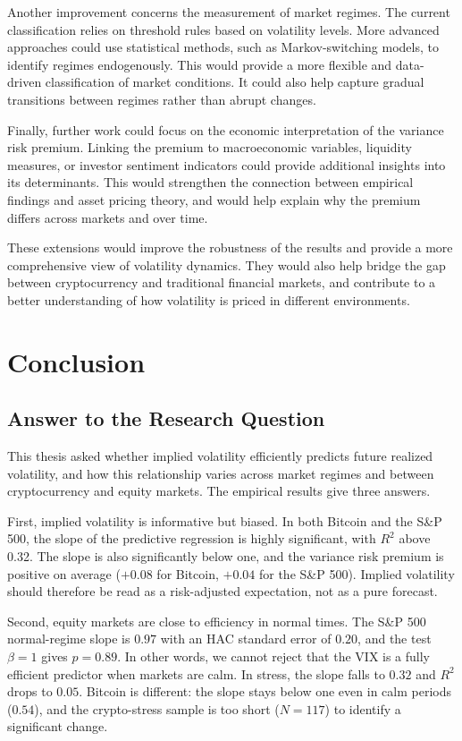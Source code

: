 \documentclass[11pt,a4paper,openany]{report}
\begin{document}
Another improvement concerns the measurement of market regimes. The
current classification relies on threshold rules based on volatility
levels. More advanced approaches could use statistical methods, such as
Markov-switching models, to identify regimes endogenously. This would
provide a more flexible and data-driven classification of market
conditions. It could also help capture gradual transitions between
regimes rather than abrupt changes.

Finally, further work could focus on the economic interpretation of the
variance risk premium. Linking the premium to macroeconomic variables,
liquidity measures, or investor sentiment indicators could provide
additional insights into its determinants. This would strengthen the
connection between empirical findings and asset pricing theory, and
would help explain why the premium differs across markets and over time.

These extensions would improve the robustness of the results and provide
a more comprehensive view of volatility dynamics. They would also help
bridge the gap between cryptocurrency and traditional financial markets,
and contribute to a better understanding of how volatility is priced in
different environments.

\chapter{Conclusion}\label{conclusion}

\section{Answer to the Research
Question}\label{answer-to-the-research-question}

This thesis asked whether implied volatility efficiently predicts
future realized volatility, and how this relationship varies across
market regimes and between cryptocurrency and equity markets. The
empirical results give three answers.

First, implied volatility is informative but biased. In both Bitcoin
and the S\&P 500, the slope of the predictive regression is highly
significant, with $R^2$ above 0.32. The slope is also significantly
below one, and the variance risk premium is positive on average
($+0.08$ for Bitcoin, $+0.04$ for the S\&P 500). Implied volatility
should therefore be read as a risk-adjusted expectation, not as a pure
forecast.

Second, equity markets are close to efficiency in normal times. The
S\&P 500 normal-regime slope is $0.97$ with an HAC standard error of
$0.20$, and the test $\beta=1$ gives $p=0.89$. In other words, we
cannot reject that the VIX is a fully efficient predictor when markets
are calm. In stress, the slope falls to $0.32$ and $R^2$ drops to
$0.05$. Bitcoin is different: the slope stays below one even in calm
periods ($0.54$), and the crypto-stress sample is too short ($N=117$)
to identify a significant change.
\end{document}
